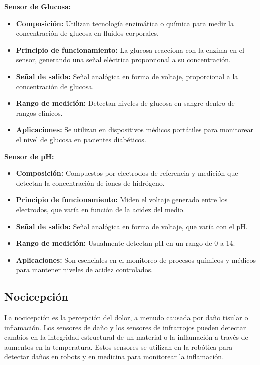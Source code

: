 \documentclass[conference]{IEEEtran}
\begin{document}
\textbf{Sensor de Glucosa:}
\begin{itemize}
    \item \textbf{Composición:} Utilizan tecnología enzimática o química para medir la concentración de glucosa en fluidos corporales.
    \item \textbf{Principio de funcionamiento:} La glucosa reacciona con la enzima en el sensor, generando una señal eléctrica proporcional a su concentración.
    \item \textbf{Señal de salida:} Señal analógica en forma de voltaje, proporcional a la concentración de glucosa.
    \item \textbf{Rango de medición:} Detectan niveles de glucosa en sangre dentro de rangos clínicos.
    \item \textbf{Aplicaciones:} Se utilizan en dispositivos médicos portátiles para monitorear el nivel de glucosa en pacientes diabéticos.
\end{itemize}
\textbf{Sensor de pH:}
\begin{itemize}
    \item \textbf{Composición:} Compuestos por electrodos de referencia y medición que detectan la concentración de iones de hidrógeno.
    \item \textbf{Principio de funcionamiento:} Miden el voltaje generado entre los electrodos, que varía en función de la acidez del medio.
    \item \textbf{Señal de salida:} Señal analógica en forma de voltaje, que varía con el pH.
    \item \textbf{Rango de medición:} Usualmente detectan pH en un rango de 0 a 14.
    \item \textbf{Aplicaciones:} Son esenciales en el monitoreo de procesos químicos y médicos para mantener niveles de acidez controlados.
\end{itemize}

\subsection{Nocicepción}

La nocicepción es la percepción del dolor, a menudo causada por daño tisular o inflamación. Los sensores de daño y los sensores de infrarrojos pueden detectar cambios en la integridad estructural de un material o la inflamación a través de aumentos en la temperatura. Estos sensores se utilizan en la robótica para detectar daños en robots y en medicina para monitorear la inflamación.\\
\end{document}
